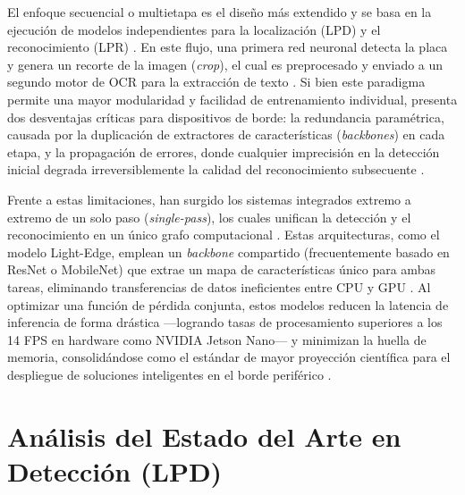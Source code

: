 El enfoque secuencial o multietapa es el diseño más extendido y se basa en la ejecución 
de modelos independientes para la localización (LPD) y el reconocimiento (LPR) 
\parencite{larocaAdvancingMultinationalLicense2025, mobeenRealTimeAutomaticLicense2026, 
ammarMultiStageDeepLearningBasedVehicle2023}. 
En este flujo, una primera red neuronal detecta la placa y genera un recorte de la 
imagen (\textit{crop}), el cual es preprocesado y enviado a un segundo motor de OCR 
para la extracción de texto 
\parencite{kuyunsaDeepLearningEnhancedAutomatic2025, mobeenRealTimeAutomaticLicense2026}. 
Si bien este paradigma permite una mayor modularidad y facilidad de entrenamiento 
individual, presenta dos desventajas críticas para dispositivos de borde: la redundancia 
paramétrica, causada por la duplicación de extractores de características 
(\textit{backbones}) en cada etapa, y la propagación de errores, donde cualquier 
imprecisión en la detección inicial degrada irreversiblemente la calidad del 
reconocimiento subsecuente 
\parencite{sonnaraEfficientRealtimeLicense2025, xuDeepLearningAlgorithms2026c}.

Frente a estas limitaciones, han surgido los sistemas integrados extremo a extremo de 
un solo paso (\textit{single-pass}), los cuales unifican la detección y el reconocimiento 
en un único grafo computacional 
\parencite{buleuDeepLearningBasedSystem2025a, sonnaraEfficientRealtimeLicense2025, 
zherzdevLPRNetLicensePlate2018}. 
Estas arquitecturas, como el modelo Light-Edge, emplean un \textit{backbone} compartido 
(frecuentemente basado en ResNet o MobileNet) que extrae un mapa de características 
único para ambas tareas, eliminando transferencias de datos ineficientes entre CPU y GPU 
\parencite{sonnaraEfficientRealtimeLicense2025}. 
Al optimizar una función de pérdida conjunta, estos modelos reducen la latencia de 
inferencia de forma drástica ---logrando tasas de procesamiento superiores a los 14 FPS 
en hardware como NVIDIA Jetson Nano--- y minimizan la huella de memoria, consolidándose 
como el estándar de mayor proyección científica para el despliegue de soluciones 
inteligentes en el borde periférico 
\parencite{sonnaraEfficientRealtimeLicense2025, zherzdevLPRNetLicensePlate2018}.


\section{Análisis del Estado del Arte en Detección (LPD)}

